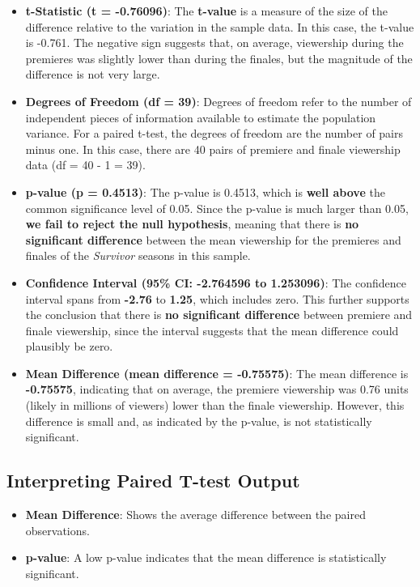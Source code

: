 \documentclass[
]{book}
\providecommand{\tightlist}{%
  \setlength{\itemsep}{0pt}\setlength{\parskip}{0pt}}
\begin{document}
\begin{itemize}
\tightlist
\item
  \textbf{t-Statistic (t = -0.76096)}: The \textbf{t-value} is a measure of the size of the difference relative to the variation in the sample data. In this case, the t-value is -0.761. The negative sign suggests that, on average, viewership during the premieres was slightly lower than during the finales, but the magnitude of the difference is not very large.
\item
  \textbf{Degrees of Freedom (df = 39)}: Degrees of freedom refer to the number of independent pieces of information available to estimate the population variance. For a paired t-test, the degrees of freedom are the number of pairs minus one. In this case, there are 40 pairs of premiere and finale viewership data (df = 40 - 1 = 39).
\item
  \textbf{p-value (p = 0.4513)}: The p-value is 0.4513, which is \textbf{well above} the common significance level of 0.05. Since the p-value is much larger than 0.05, \textbf{we fail to reject the null hypothesis}, meaning that there is \textbf{no significant difference} between the mean viewership for the premieres and finales of the \emph{Survivor} seasons in this sample.
\item
  \textbf{Confidence Interval (95\% CI: -2.764596 to 1.253096)}: The confidence interval spans from \textbf{-2.76} to \textbf{1.25}, which includes zero. This further supports the conclusion that there is \textbf{no significant difference} between premiere and finale viewership, since the interval suggests that the mean difference could plausibly be zero.
\item
  \textbf{Mean Difference (mean difference = -0.75575)}: The mean difference is \textbf{-0.75575}, indicating that on average, the premiere viewership was 0.76 units (likely in millions of viewers) lower than the finale viewership. However, this difference is small and, as indicated by the p-value, is not statistically significant.
\end{itemize}

\subsection*{Interpreting Paired T-test Output}\label{interpreting-paired-t-test-output}

\begin{itemize}
\tightlist
\item
  \textbf{Mean Difference}: Shows the average difference between the paired observations.
\item
  \textbf{p-value}: A low p-value indicates that the mean difference is statistically significant.
\end{itemize}
\end{document}
